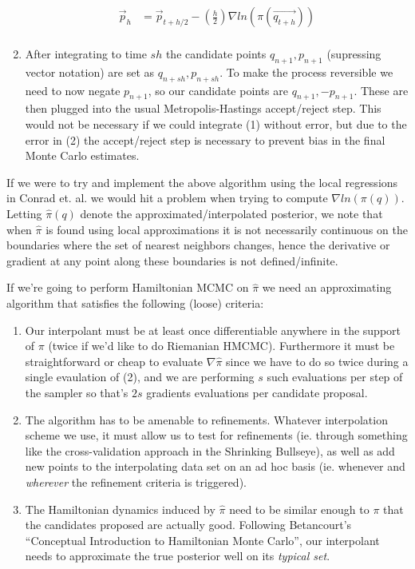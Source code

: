 \documentclass[12pt,a4paper]{article}
\begin{document}
\begin{enumerate}
\begin{equation}
\begin{split}
\vec{p}_h &= \vec{p}_{t+h/2} - (\frac{h}{2})  \nabla ln(\pi(\vec{q_{t+h}})) \\
\end{split}
\end{equation}
\item After integrating to time $sh$ the candidate points $q_{n+1}, p_{n+1}$ (supressing vector notation) are set as $q_{n+sh}, p_{n+sh}$.  To make the process reversible we need to now negate $p_{n+1}$, so our candidate points are $q_{n+1}, -p_{n+1}$.  These are then plugged into the usual Metropolis-Hastings accept/reject step.  This would not be necessary if we could integrate (1) without error, but due to the error in (2) the accept/reject step is necessary to prevent bias in the final Monte Carlo estimates.
\end{enumerate}

If we were to try and implement the above algorithm using the local regressions in Conrad et. al. \parencite{conrad_accelerating_2015} we would hit a problem when trying to compute $\nabla ln(\pi(q))$.  Letting $\hat{\pi}(q)$ denote the approximated/interpolated posterior, we note that when $\hat{\pi}$ is found using local approximations it is not necessarily continuous on the boundaries where the set of nearest neighbors changes, hence the derivative or gradient at any point along these boundaries is not defined/infinite.

If we're going to perform Hamiltonian MCMC on $\hat{\pi}$ we need an approximating algorithm that satisfies the following (loose) criteria:
\begin{enumerate}
\item Our interpolant must be at least once differentiable anywhere in the support of $\pi$ (twice if we'd like to do Riemanian HMCMC).  Furthermore it must be straightforward or cheap to evaluate $\nabla \hat{\pi}$ since we have to do so twice during a single evaulation of (2), and we are performing $s$ such evaluations per step of the sampler so that's $2s$ gradients evaluations per candidate proposal.
\item The algorithm has to be amenable to refinements.  Whatever interpolation scheme we use, it must allow us to test for refinements (ie. through something like the cross-validation approach in the Shrinking Bullseye), as well as add new points to the interpolating data set on an ad hoc basis (ie. whenever and \textit{wherever} the refinement criteria is triggered).
\item The Hamiltonian dynamics induced by $\hat{\pi}$ need to be similar enough to $\pi$ that the candidates proposed are actually good.  Following Betancourt's ``Conceptual Introduction to Hamiltonian Monte Carlo'', our interpolant needs to approximate the true posterior well on its \textit{typical set}.
\end{enumerate}
\end{document}
